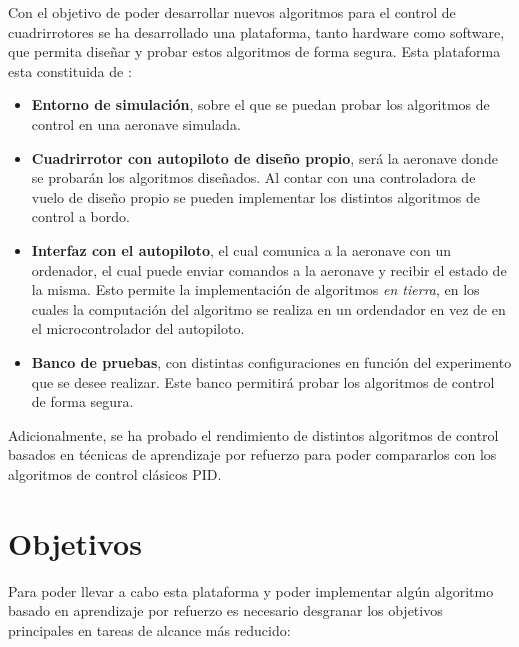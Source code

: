 Con el objetivo de poder desarrollar nuevos algoritmos para el control de cuadrirrotores se ha desarrollado una plataforma, tanto hardware como software, que permita diseñar y probar estos algoritmos de forma segura. Esta plataforma esta constituida de :

\begin{itemize}
	\item \textbf{Entorno de simulación}, sobre el que se puedan probar los algoritmos de control en una aeronave simulada.
	\item \textbf{Cuadrirrotor con autopiloto de diseño propio}, será la aeronave donde se probarán los algoritmos diseñados. Al contar con una controladora de vuelo de diseño propio se pueden implementar los distintos algoritmos de control a bordo.
	\item \textbf{Interfaz con el autopiloto}, el cual comunica a la aeronave con un ordenador, el cual puede enviar comandos a la aeronave y recibir el estado de la misma. Esto permite la implementación de algoritmos \textit{en tierra}, en los cuales la computación del algoritmo se realiza en un ordendador en vez de en el microcontrolador del autopiloto. 
	\item \textbf{Banco de pruebas}, con distintas configuraciones en función del experimento que se desee realizar. Este banco permitirá probar los algoritmos de control de forma segura.
	
\end{itemize}


 Adicionalmente, se ha probado el rendimiento de distintos algoritmos de control basados en técnicas de aprendizaje por refuerzo para poder compararlos con los algoritmos de control clásicos PID.
 
 \section{Objetivos}
 Para poder llevar a cabo esta plataforma y poder implementar algún algoritmo basado en aprendizaje por refuerzo es necesario desgranar los objetivos principales en tareas de alcance más reducido:
 
